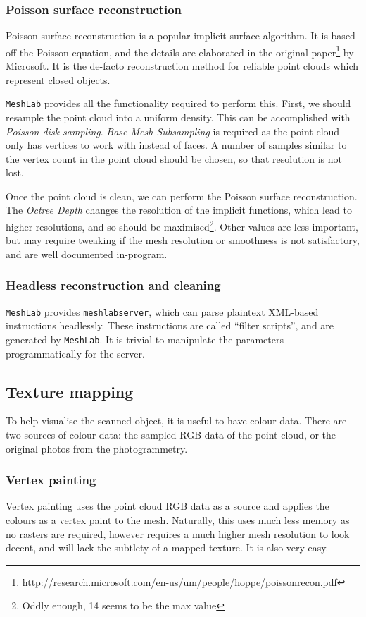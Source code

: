 \subsubsection{Poisson surface reconstruction}
Poisson surface reconstruction is a popular implicit surface algorithm. It is based off the Poisson equation, and the details are elaborated in the original paper\footnote{\url{http://research.microsoft.com/en-us/um/people/hoppe/poissonrecon.pdf}} by Microsoft. It is the de-facto reconstruction method for reliable point clouds which represent closed objects.

{\tt MeshLab} provides all the functionality required to perform this. First, we should resample the point cloud into a uniform density. This can be accomplished with \emph{Poisson-disk sampling}. \emph{Base Mesh Subsampling} is required as the point cloud only has vertices to work with instead of faces. A number of samples similar to the vertex count in the point cloud should be chosen, so that resolution is not lost.

Once the point cloud is clean, we can perform the Poisson surface reconstruction. The \emph{Octree Depth} changes the resolution of the implicit functions, which lead to higher resolutions, and so should be maximised\footnote{Oddly enough, 14 seems to be the max value}. Other values are less important, but may require tweaking if the mesh resolution or smoothness is not satisfactory, and are well documented in-program.

\subsubsection{Headless reconstruction and cleaning}

{\tt MeshLab} provides {\tt meshlabserver}, which can parse plaintext XML-based instructions headlessly. These instructions are called ``filter scripts'', and are generated by {\tt MeshLab}. It is trivial to manipulate the parameters programmatically for the server.

\subsection{Texture mapping}
To help visualise the scanned object, it is useful to have colour data. There are two sources of colour data: the sampled RGB data of the point cloud, or the original photos from the photogrammetry.
\subsubsection{Vertex painting}
Vertex painting uses the point cloud RGB data as a source and applies the colours as a vertex paint to the mesh. Naturally, this uses much less memory as no rasters are required, however requires a much higher mesh resolution to look decent, and will lack the subtlety of a mapped texture. It is also very easy.

